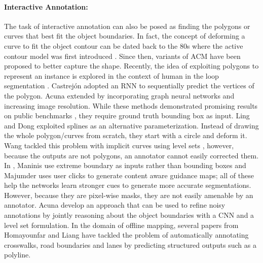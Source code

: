\documentclass[10pt,twocolumn,letterpaper]{article}
\begin{document}
\vspace{-0.2cm}

\paragraph{Interactive Annotation:} The task of interactive annotation can also be posed as finding the polygons or curves that best fit the object boundaries. In fact, the concept of deforming a curve to fit the object contour can be dated back to the 80s where the active contour model was first introduced \cite{kass1988snakes}. Since then,  variants of ACM \cite{cohen1991active,marcos2018learning,dom2019darnet} have been proposed to better capture the shape.  Recently, the idea of exploiting polygons to represent an instance is explored in the context of human in the loop segmentation \cite{polygon-rnn,polygon-rnn++}. Castrej{\'o}n \etal \cite{polygon-rnn} adopted an RNN to sequentially predict the vertices of the polygon. Acuna \etal \cite{polygon-rnn++} extended \cite{polygon-rnn} by incorporating graph neural networks and increasing image resolution. While these methods demonstrated promising results on public benchmarks \cite{cityscapes}, they require ground truth bounding box as input. Ling \etal \cite{ling2019fast} and Dong \etal \cite{deep-active-curve} exploited splines as an alternative parameterization. Instead of drawing the whole polygon/curves from scratch, they start with a circle and deform it. Wang \etal  tackled this problem with implicit curves using level sets \cite{wang2019delse}, however, because the outputs are not polygons, an annotator cannot easily corrected them. In \cite{dextr}, Maninis \etal use extreme boundary as inputs rather than bounding boxes and Majumder \etal \cite{Majumder_2019_CVPR} uses user clicks to generate content aware guidance maps; all of these help the networks learn stronger cues to generate more accurate segmentations. However, because they are pixel-wise masks, they are not easily amenable by an annotator. Acuna \etal \cite{AcunaCVPR19STEAL} develop an approach that can be used to refine noisy annotations by jointly reasoning about the object boundaries with a CNN and a level set formulation. In the domain of offline mapping, several papers from Homayounfar \etal and Liang \etal \cite{HomayounfarMLU18, LiangHMWU19, Homayounfar_2019_ICCV, Liang2018EndtoEndDS} have tackled the problem of automatically annotating crosswalks, road boundaries and lanes by predicting structured outputs such as a polyline.
\end{document}
